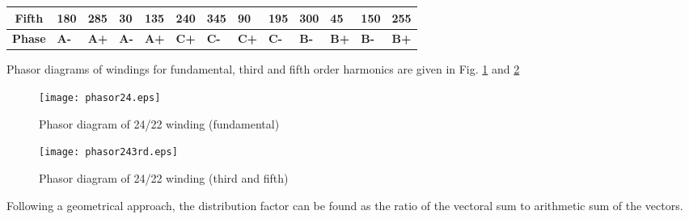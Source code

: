 \documentclass{reportClass}
\begin{document}
\begin{table}[h!]
\begin{tabular}{|cllllllllllll|}
\multicolumn{1}{|c|}{\textbf{Fifth}}   & \multicolumn{1}{l|}{180}                                 & \multicolumn{1}{l|}{285}                                 & \multicolumn{1}{l|}{30}                                  & \multicolumn{1}{l|}{135}                                 & \multicolumn{1}{l|}{240}                                 & \multicolumn{1}{l|}{345}                                 & \multicolumn{1}{l|}{90}                                  & \multicolumn{1}{l|}{195}                                 & \multicolumn{1}{l|}{300}                                 & \multicolumn{1}{l|}{45}                                  & \multicolumn{1}{l|}{150}                                 & 255                                 \\ \hline
\multicolumn{1}{|c|}{\textbf{Phase}}   & \multicolumn{1}{l|}{\cellcolor[HTML]{FCFF2F}\textbf{A-}} & \multicolumn{1}{l|}{\cellcolor[HTML]{FCFF2F}\textbf{A+}} & \multicolumn{1}{l|}{\cellcolor[HTML]{FCFF2F}\textbf{A-}} & \multicolumn{1}{l|}{\cellcolor[HTML]{FCFF2F}\textbf{A+}} & \multicolumn{1}{l|}{\cellcolor[HTML]{CBCEFB}\textbf{C+}} & \multicolumn{1}{l|}{\cellcolor[HTML]{CBCEFB}\textbf{C-}} & \multicolumn{1}{l|}{\cellcolor[HTML]{CBCEFB}\textbf{C+}} & \multicolumn{1}{l|}{\cellcolor[HTML]{CBCEFB}\textbf{C-}} & \multicolumn{1}{l|}{\cellcolor[HTML]{90E3FB}\textbf{B-}} & \multicolumn{1}{l|}{\cellcolor[HTML]{90E3FB}\textbf{B+}} & \multicolumn{1}{l|}{\cellcolor[HTML]{90E3FB}\textbf{B-}} & \cellcolor[HTML]{90E3FB}\textbf{B+} \\ \hline
\end{tabular}
\end{table}

Phasor diagrams of windings for fundamental, third and fifth order harmonics are given in Fig. \ref{fig:phas24} and \ref{fig:phas243} 

\begin{figure}[h!]
    \centering
    \texttt{[image: phasor24.eps]}
    \caption{Phasor diagram of 24/22 winding (fundamental)}
    \label{fig:phas24}
\end{figure}

\begin{figure}[h!]
    \centering
    \texttt{[image: phasor243rd.eps]}
    \caption{Phasor diagram of 24/22 winding (third and fifth)}
    \label{fig:phas243}
\end{figure}

Following a geometrical approach, the distribution factor can be found as the ratio of the vectoral sum to arithmetic sum of the vectors.
\end{document}
